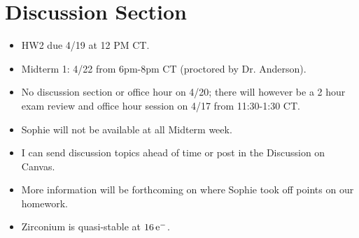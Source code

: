 \documentclass[../notes.tex]{subfiles}
\begin{document}
\section{Discussion Section}
\begin{itemize}
    \item HW2 due 4/19 at 12 PM CT.
    \item Midterm 1: 4/22 from 6pm-8pm CT (proctored by Dr. Anderson).
    \item No discussion section or office hour on 4/20; there will however be a 2 hour exam review and office hour session on 4/17 from 11:30-1:30 CT.
    \item Sophie will not be available at all Midterm week.
    \item I can send discussion topics ahead of time or post in the Discussion on Canvas.
    \item More information will be forthcoming on where Sophie took off points on our homework.
    \item Zirconium is quasi-stable at $16\,\e[-]$.
\end{itemize}
\end{document}
